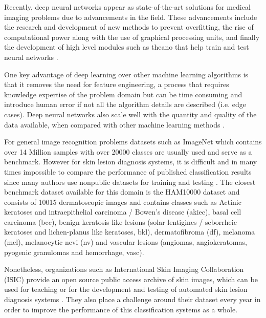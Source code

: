     Recently, deep neural networks appear as state-of-the-art solutions for medical imaging problems due to advancements in the field. These advancements include the research and development of new methods to prevent overfitting, the rise of computational power along with the use of graphical processing units, and finally the development of high level modules such as theano \cite{Bastien} that help train and test neural networks . \par    
    
    One key advantage of deep learning over other machine learning algorithms is that it removes the need for feature engineering, a process that requires knowledge expertise of the problem domain but can be time consuming and introduce human error if not all the algorithm details are described (i.e. edge cases). Deep neural networks also scale well with the quantity and quality of the data available, when compared with other machine learning methods \cite{?}. \par 
    
    For general image recognition problems datasets such as ImageNet \cite{Deng2010} which contains over 14 Million samples with over 20000 classes are usually used and serve as a benchmark. However for skin lesion diagnosis systems, it is difficult and in many times impossible to compare the performance of published classification results since many authors use nonpublic datasets for training and testing \cite{Brinker2018}. The closest benchmark dataset available for this domain is the HAM10000 dataset \cite{ham10000} and consists of 10015 dermatoscopic images and contains classes such as Actinic keratoses and intraepithelial carcinoma / Bowen's disease (akiec), basal cell carcinoma (bcc), benign keratosis-like lesions (solar lentigines / seborrheic keratoses and lichen-planus like keratoses, bkl), dermatofibroma (df), melanoma (mel), melanocytic nevi (nv) and vascular lesions (angiomas, angiokeratomas, pyogenic granulomas and hemorrhage, vasc).\par
    
    Nonetheless, organizations such as International Skin Imaging Collaboration (ISIC) provide an open source public access archive of skin images, which can be used for teaching or for the development and testing of automated skin lesion diagnosis systems \cite{isic2019}. They also place a challenge around their dataset every year in order to improve the performance of this classification systems as a whole. \par
    

